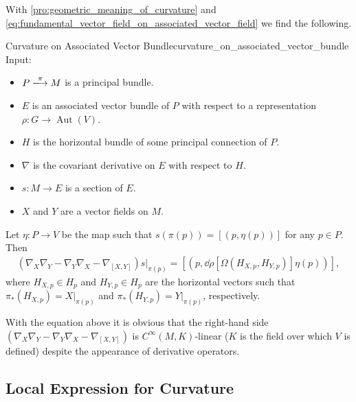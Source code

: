 \documentclass{article}
\begin{document}
With \cref{pro:geometric_meaning_of_curvature} and \cref{eq:fundamental_vector_field_on_associated_vector_field} we find the following.

\begin{proposition}{Curvature on Associated Vector Bundle}{curvature_on_associated_vector_bundle}
    Input:
    \begin{itemize}
        \item $P\xlongrightarrow{\pi} M$ is a principal bundle.
        \item $E$ is an associated vector bundle of $P$ with respect to a representation $\rho: G\rightarrow \operatorname{Aut}(V)$.
        \item $H$ is the horizontal bundle of some principal connection of $P$.
        \item $\nabla$ is the covariant derivative on $E$ with respect to $H$.
        \item $s: M \rightarrow E$ is a section of $E$.
        \item $X$ and $Y$ are a vector fields on $M$.
    \end{itemize}
    Let $\eta: P \rightarrow V$ be the map such that $s(\pi(p)) = [(p, \eta(p))]$ for any $p\in P$. Then
    \begin{gather*}
        (\nabla_X \nabla_Y - \nabla_Y \nabla_X - \nabla_{[X,Y]})s\vert_{\pi(p)}
        = [(p, \dd{\rho}[\Omega(H_{X,p}, H_{Y,p})]\eta(p))],
    \end{gather*}
    where $H_{X,p} \in H_p$ and $H_{Y,p} \in H_p$ are the horizontal vectors such that $\pi_*(H_{X,p}) = X\vert_{\pi(p)}$ and $\pi_*(H_{Y,p}) = Y\vert_{\pi(p)}$, respectively.
\end{proposition}
With the equation above it is obvious that the right-hand side $(\nabla_X \nabla_Y - \nabla_Y \nabla_X - \nabla_{[X,Y]})$ is $C^\infty(M, K)$-linear ($K$ is the field over which $V$ is defined) despite the appearance of derivative operators.

\subsection{Local Expression for Curvature}
\end{document}
